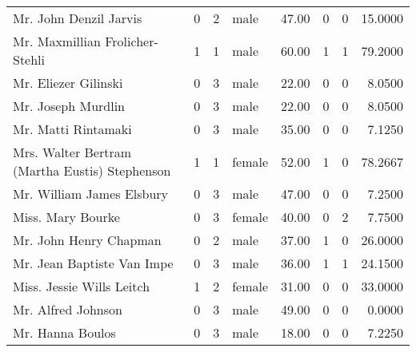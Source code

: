 \begin{tabular}{lrrlrrrr}
Mr. John Denzil Jarvis                             &         0 &       2 &    male &  47.00 &                        0 &                        0 &   15.0000 \\
Mr. Maxmillian Frolicher-Stehli                    &         1 &       1 &    male &  60.00 &                        1 &                        1 &   79.2000 \\
Mr. Eliezer Gilinski                               &         0 &       3 &    male &  22.00 &                        0 &                        0 &    8.0500 \\
Mr. Joseph Murdlin                                 &         0 &       3 &    male &  22.00 &                        0 &                        0 &    8.0500 \\
Mr. Matti Rintamaki                                &         0 &       3 &    male &  35.00 &                        0 &                        0 &    7.1250 \\
Mrs. Walter Bertram (Martha Eustis) Stephenson     &         1 &       1 &  female &  52.00 &                        1 &                        0 &   78.2667 \\
Mr. William James Elsbury                          &         0 &       3 &    male &  47.00 &                        0 &                        0 &    7.2500 \\
Miss. Mary Bourke                                  &         0 &       3 &  female &  40.00 &                        0 &                        2 &    7.7500 \\
Mr. John Henry Chapman                             &         0 &       2 &    male &  37.00 &                        1 &                        0 &   26.0000 \\
Mr. Jean Baptiste Van Impe                         &         0 &       3 &    male &  36.00 &                        1 &                        1 &   24.1500 \\
Miss. Jessie Wills Leitch                          &         1 &       2 &  female &  31.00 &                        0 &                        0 &   33.0000 \\
Mr. Alfred Johnson                                 &         0 &       3 &    male &  49.00 &                        0 &                        0 &    0.0000 \\
Mr. Hanna Boulos                                   &         0 &       3 &    male &  18.00 &                        0 &                        0 &    7.2250 \\

\end{tabular}
